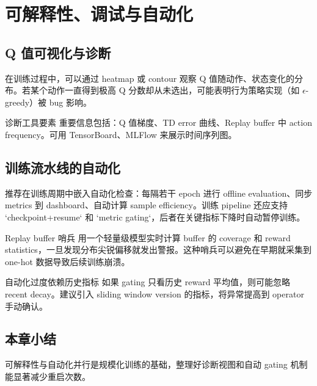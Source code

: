 \section{可解释性、调试与自动化}

\subsection{Q 值可视化与诊断}

在训练过程中，可以通过 heatmap 或 contour 观察 Q 值随动作、状态变化的分布。若某个动作一直得到极高 Q 分数却从未选出，可能表明行为策略实现（如 $\epsilon$-greedy）被 bug 影响。

\begin{knowledgebox}{诊断工具要素}
重要信息包括：Q 值梯度、TD error 曲线、Replay buffer 中 action frequency。可用 TensorBoard、MLFlow 来展示时间序列图。
\end{knowledgebox}

\subsection{训练流水线的自动化}

推荐在训练周期中嵌入自动化检查：每隔若干 epoch 进行 offline evaluation、同步 metrics 到 dashboard、自动计算 sample efficiency。训练 pipeline 还应支持 `checkpoint+resume` 和 `metric gating`，后者在关键指标下降时自动暂停训练。

\begin{importantbox}{Replay buffer 哨兵}
用一个轻量级模型实时计算 buffer 的 coverage 和 reward statistics，一旦发现分布尖锐偏移就发出警报。这种哨兵可以避免在早期就采集到 one-hot 数据导致后续训练崩溃。
\end{importantbox}

\begin{warningbox}{自动化过度依赖历史指标}
如果 gating 只看历史 reward 平均值，则可能忽略 recent decay。建议引入 sliding window version 的指标，将异常提高到 operator 手动确认。
\end{warningbox}

\subsection{本章小结}

可解释性与自动化并行是规模化训练的基础，整理好诊断视图和自动 gating 机制能显著减少重启次数。

